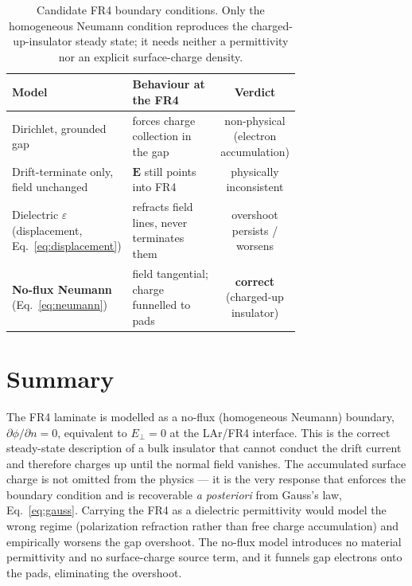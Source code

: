 \documentclass[11pt]{article}
\newcommand{\En}{E_{\perp}}
\begin{document}
\begin{table}[h]
\centering
\begin{tabular}{@{}p{0.30\linewidth} p{0.42\linewidth} c@{}}
\toprule
\textbf{Model} & \textbf{Behaviour at the FR4} & \textbf{Verdict} \\
\midrule
Dirichlet, grounded gap & forces charge collection in the gap
  & non-physical (electron accumulation) \\
Drift-terminate only, field unchanged & $\mathbf{E}$ still points into FR4
  & physically inconsistent \\
Dielectric $\varepsilon$ (displacement, Eq.~\ref{eq:displacement})
  & refracts field lines, never terminates them
  & overshoot persists / worsens \\
\textbf{No-flux Neumann} (Eq.~\ref{eq:neumann})
  & field tangential; charge funnelled to pads
  & \textbf{correct} (charged-up insulator) \\
\bottomrule
\end{tabular}
\caption{Candidate FR4 boundary conditions. Only the homogeneous Neumann condition
reproduces the charged-up-insulator steady state; it needs neither a permittivity
nor an explicit surface-charge density.}
\end{table}

\section{Summary}

The FR4 laminate is modelled as a no-flux (homogeneous Neumann) boundary,
$\partial\phi/\partial n = 0$, equivalent to $\En=0$ at the LAr/FR4 interface. This
is the correct steady-state description of a bulk insulator that cannot conduct the
drift current and therefore charges up until the normal field vanishes. The
accumulated surface charge is not omitted from the physics --- it is the very
response that enforces the boundary condition and is recoverable \emph{a posteriori}
from Gauss's law, Eq.~\eqref{eq:gauss}. Carrying the FR4 as a dielectric
permittivity would model the wrong regime (polarization refraction rather than free
charge accumulation) and empirically worsens the gap overshoot. The no-flux model
introduces no material permittivity and no surface-charge source term, and it
funnels gap electrons onto the pads, eliminating the overshoot.
\end{document}
